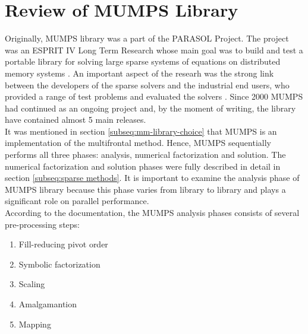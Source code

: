 \section{Review of MUMPS Library}
\label{subseq:mumps-review}

Originally, MUMPS library was a part of the PARASOL Project. The project was an ESPRIT IV Long Term Research whose main goal was to build and test a portable library for solving large sparse systems of equations on distributed memory systems \cite{PARASOL}. An important aspect of the researh was the strong link between the developers of the sparse solvers and the industrial end users, who provided a range of test problems and evaluated the solvers \cite{MUMPS:description}. Since 2000 MUMPS had continued as an ongoing project and, by the moment of writing, the library have contained almost 5 main releases.\\



It was mentioned in section \ref{subseq:mm-library-choice} that MUMPS is an implementation of the multifrontal method. Hence, MUMPS sequentially performs all three phases: analysis, numerical factorization and solution. The numerical factorization and solution phases were fully described in detail in section \ref{subseq:sparse methods}. It is important to examine the analysis phase of MUMPS library because this phase varies from library to library and plays a significant role on parallel performance.\\


According to the documentation, the MUMPS analysis phases consists of several pre-processing steps:

\begin{enumerate}
  \item Fill-reducing pivot order \label{mumps:analysis-steps:1}
  \item Symbolic factorization \label{mumps:analysis-steps:2}
  \item Scaling \label{mumps:analysis-steps:3}
  \item Amalgamantion \label{mumps:analysis-steps:4}
  \item Mapping \label{mumps:analysis-steps:5}
\end{enumerate}


